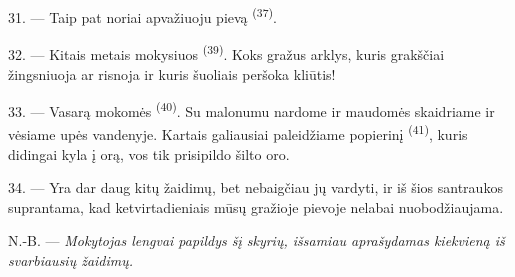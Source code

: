 \VUsaut{4.6mm}
\VUsaut{3.0mm}

31. --- Taip pat noriai apvažiuoju pievą  \textsuperscript{(37)}.

32. --- Kitais metais mokysiuos  \textsuperscript{(39)}. Koks
gražus arklys, kuris grakščiai žingsniuoja ar risnoja ir kuris šuoliais peršoka
kliūtis!

33. --- Vasarą mokomės  \textsuperscript{(40)}. Su malonumu nardome
ir maudomės skaidriame ir vėsiame upės vandenyje. Kartais galiausiai paleidžiame
popierinį  \textsuperscript{(41)}, kuris didingai kyla į orą, vos tik
prisipildo šilto oro.

34. --- Yra dar daug kitų žaidimų, bet nebaigčiau jų vardyti, ir iš šios santraukos
suprantama, kad ketvirtadieniais mūsų gražioje pievoje nelabai nuobodžiaujama.

N.-B. --- \textit{Mokytojas lengvai papildys šį skyrių, išsamiau aprašydamas kiekvieną
iš svarbiausių žaidimų.}
